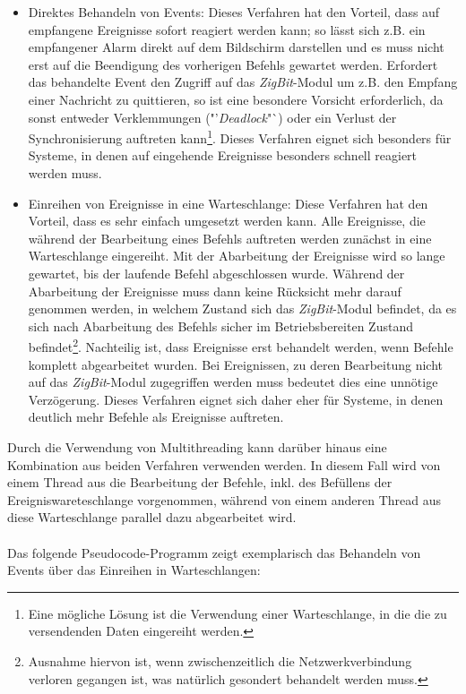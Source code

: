             \begin{itemize}
                \item{Direktes Behandeln von Events:} Dieses Verfahren hat den Vorteil, dass auf empfangene 
                Ereignisse sofort reagiert werden kann; so lässt sich z.B. ein empfangener Alarm direkt
                auf dem Bildschirm darstellen und es muss nicht erst auf die Beendigung des vorherigen
                Befehls gewartet werden. Erfordert das behandelte Event den Zugriff auf das 
                \emph{ZigBit}-Modul um z.B. den Empfang einer Nachricht zu quittieren, so ist eine
                besondere Vorsicht erforderlich, da sonst entweder Verklemmungen ("'\emph{Deadlock}"`) oder
                ein Verlust der Synchronisierung auftreten kann\footnote{Eine mögliche Lösung ist die
                Verwendung einer Warteschlange, in die die zu versendenden Daten eingereiht werden.}.
                Dieses Verfahren eignet sich besonders für Systeme, in denen auf eingehende Ereignisse besonders
                schnell reagiert werden muss.

                \item{Einreihen von Ereignisse in eine Warteschlange:} Diese Verfahren hat den Vorteil, dass
                es sehr einfach umgesetzt werden kann. Alle Ereignisse, die während der Bearbeitung eines Befehls
                auftreten werden zunächst in eine Warteschlange eingereiht. Mit der Abarbeitung der Ereignisse
                wird so lange gewartet, bis der laufende Befehl abgeschlossen wurde. Während der Abarbeitung der
                Ereignisse muss dann keine Rücksicht mehr darauf genommen werden, in welchem Zustand sich das
                \emph{ZigBit}-Modul befindet, da es sich nach Abarbeitung des Befehls sicher im Betriebsbereiten
                Zustand befindet\footnote{Ausnahme hiervon ist, wenn zwischenzeitlich die Netzwerkverbindung verloren
                gegangen ist, was natürlich gesondert behandelt werden muss.}. Nachteilig ist, dass Ereignisse
                erst behandelt werden, wenn Befehle komplett abgearbeitet wurden. Bei Ereignissen, zu deren Bearbeitung
                nicht auf das \emph{ZigBit}-Modul zugegriffen werden muss bedeutet dies eine unnötige Verzögerung.
                Dieses Verfahren eignet sich daher eher für Systeme, in denen deutlich mehr Befehle als Ereignisse
                auftreten.
            \end{itemize}

            Durch die Verwendung von Multithreading kann darüber hinaus eine Kombination aus beiden Verfahren
            verwenden werden. In diesem Fall wird von einem Thread aus die Bearbeitung der Befehle, inkl. des
            Befüllens der Ereigniswareteschlange vorgenommen, während von einem anderen Thread aus diese Warteschlange
            parallel dazu abgearbeitet wird.\\
            \\
            Das folgende Pseudocode-Programm zeigt exemplarisch das Behandeln von Events über das Einreihen in
            Warteschlangen:

